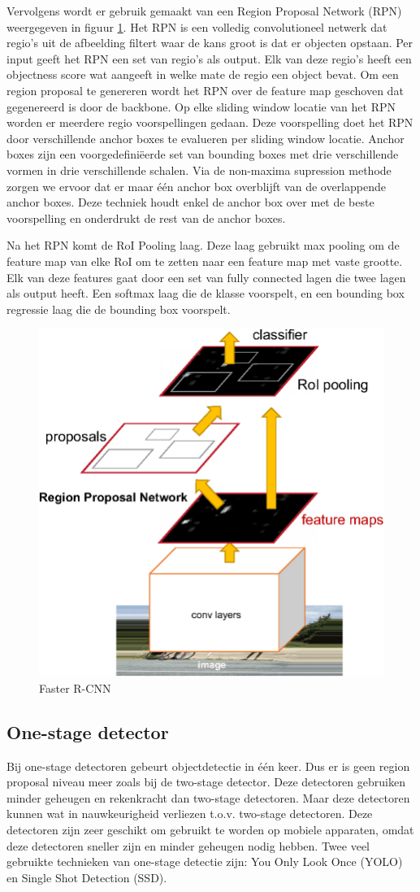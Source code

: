 Vervolgens wordt er gebruik gemaakt van een Region Proposal Network (RPN) weergegeven in figuur \ref{fig:faster-r-cnn}. 
Het RPN is een volledig convolutioneel netwerk dat regio's uit de afbeelding filtert waar de kans groot is dat er objecten opstaan.
Per input geeft het RPN een set van regio's als output.
Elk van deze regio's heeft een objectness score wat aangeeft in welke mate de regio een object bevat.
Om een region proposal te genereren wordt het RPN over de feature map geschoven dat gegenereerd is door de backbone.
Op elke sliding window locatie van het RPN worden er meerdere regio voorspellingen gedaan.
Deze voorspelling doet het RPN door verschillende anchor boxes te evalueren per sliding window locatie.
Anchor boxes zijn een voorgedefini\"eerde set van bounding boxes met drie verschillende vormen in drie verschillende schalen.
Via de non-maxima supression methode zorgen we ervoor dat er maar \'e\'en anchor box overblijft van de overlappende anchor boxes. 
Deze techniek houdt enkel de anchor box over met de beste voorspelling en onderdrukt de rest van de anchor boxes.

Na het RPN komt de RoI Pooling laag.
Deze laag gebruikt max pooling om de feature map van elke RoI om te zetten naar een feature map met vaste grootte.
Elk van deze features gaat door een set van fully connected lagen die twee lagen als output heeft.
Een softmax laag die de klasse voorspelt, en een bounding box regressie laag die de bounding box voorspelt.

\begin{figure}[!ht]
    \centering
 	\includegraphics[width=0.35\linewidth]{fig/Faster-R-CNN.png}
 	\caption{Faster R-CNN}
 	\label{fig:faster-r-cnn}
\end{figure}

\subsection{One-stage detector}
Bij one-stage detectoren gebeurt objectdetectie in \'e\'en keer. 
Dus er is geen region proposal niveau meer zoals bij de two-stage detector. 
Deze detectoren gebruiken minder geheugen en rekenkracht dan two-stage detectoren.
Maar deze detectoren kunnen wat in nauwkeurigheid verliezen t.o.v. two-stage detectoren.
Deze detectoren zijn zeer geschikt om gebruikt te worden op mobiele apparaten, omdat deze detectoren sneller zijn en minder geheugen nodig hebben.
Twee veel gebruikte technieken van one-stage detectie zijn: You Only Look Once (YOLO) en Single Shot Detection (SSD).


